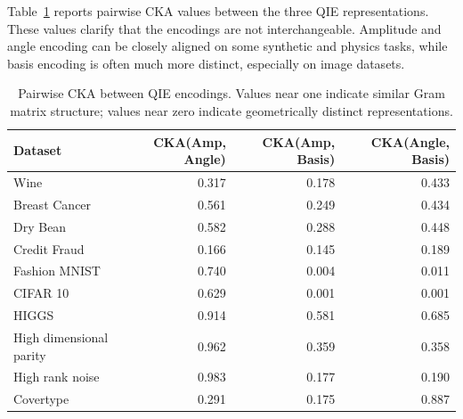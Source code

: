 \documentclass[12pt]{article}
\begin{document}
Table~\ref{tab:cka_full} reports pairwise CKA values between the three QIE
representations. These values clarify that the encodings are not
interchangeable. Amplitude and angle encoding can be closely aligned on some
synthetic and physics tasks, while basis encoding is often much more distinct,
especially on image datasets.

\begin{table}[H]
\centering
\caption{Pairwise CKA between QIE encodings. Values near one indicate similar
Gram matrix structure; values near zero indicate geometrically distinct
representations.}
\label{tab:cka_full}
\small
\begin{tabular}{lrrr}
\toprule
Dataset & CKA(Amp, Angle) & CKA(Amp, Basis) & CKA(Angle, Basis) \\
\midrule
Wine            & 0.317 & 0.178 & 0.433 \\
Breast Cancer   & 0.561 & 0.249 & 0.434 \\
Dry Bean        & 0.582 & 0.288 & 0.448 \\
Credit Fraud    & 0.166 & 0.145 & 0.189 \\
Fashion MNIST   & 0.740 & 0.004 & 0.011 \\
CIFAR 10        & 0.629 & 0.001 & 0.001 \\
HIGGS           & 0.914 & 0.581 & 0.685 \\
High dimensional parity & 0.962 & 0.359 & 0.358 \\
High rank noise & 0.983 & 0.177 & 0.190 \\
Covertype       & 0.291 & 0.175 & 0.887 \\
\bottomrule
\end{tabular}
\end{table}
\end{document}
